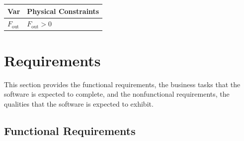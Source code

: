 \documentclass[12pt]{article}
\begin{document}
\begin{table}[!h]
\caption{Output Data Constraints} \label{TblOutputVar}
\renewcommand{\arraystretch}{1.2}
\noindent 
\begin{longtable*}{l l} 
  \toprule
  \textbf{Var} & \textbf{Physical Constraints} \\
  \midrule 
  $F_\text{out}$ & $F_\text{out} > 0$  \\
  \bottomrule
\end{longtable*}
\end{table}

\section{Requirements}

This section provides the functional requirements, the business tasks that the
software is expected to complete, and the nonfunctional requirements, the
qualities that the software is expected to exhibit.

\subsection{Functional Requirements}
\end{document}
